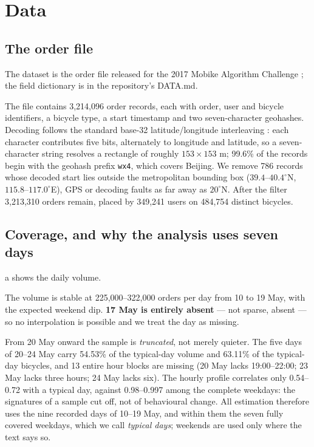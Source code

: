 \section{Data}\label{sec:data}

\subsection{The order file}

The dataset is the order file released for the 2017 Mobike Algorithm Challenge
\cite{mobike}; the field dictionary is in the repository's DATA.md.

The file contains 3,214,096 order records, each with order, user and bicycle
identifiers, a bicycle type, a start timestamp and two seven-character geohashes.
Decoding follows the standard base-32 latitude/longitude interleaving
\cite{niemeyer2008}: each character contributes five bits, alternately to longitude
and latitude, so a seven-character string resolves a rectangle of roughly
$153\times153$ m; 99.6\% of the records begin with the geohash prefix \texttt{wx4},
which covers Beijing. We remove 786 records whose decoded start lies outside the
metropolitan bounding box ($39.4$--$40.4^\circ$N, $115.8$--$117.0^\circ$E), GPS or
decoding faults as far away as $20^\circ$N. After the filter 3,213,310 orders remain,
placed by 349,241 users on 484,754 distinct bicycles.

\subsection{Coverage, and why the analysis uses seven days}

a shows the daily volume.

The volume is stable at 225,000--322,000 orders per day from 10 to 19 May, with the
expected weekend dip. \textbf{17 May is entirely absent} --- not sparse, absent ---
so no interpolation is possible and we treat the day as missing.

From 20 May onward the sample is \emph{truncated}, not merely quieter. The five days
of 20--24 May carry 54.53\% of the typical-day volume and 63.11\% of the typical-day
bicycles, and 13 entire hour blocks are missing (20 May lacks 19:00--22:00; 23 May
lacks three hours; 24 May lacks six). The hourly profile correlates only 0.54--0.72
with a typical day, against 0.98--0.997 among the complete weekdays: the signatures of
a sample cut off, not of behavioural change. All estimation therefore uses the nine
recorded days of 10--19 May, and within them the seven fully covered weekdays, which
we call \emph{typical days}; weekends are used only where the text says so.

